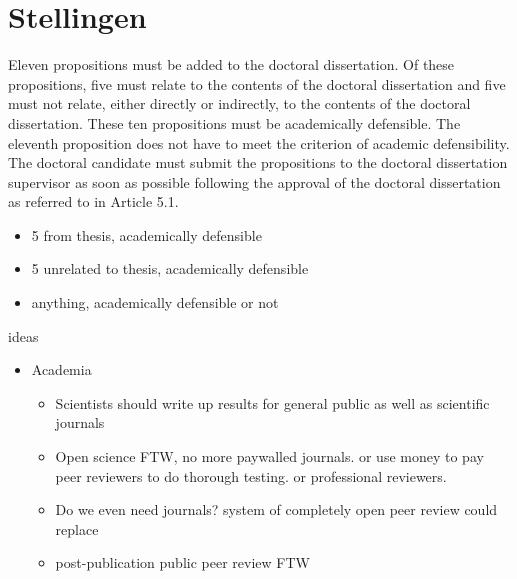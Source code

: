 \chapter*{Stellingen}

Eleven propositions must be added to the doctoral dissertation. Of these propositions,
five must relate to the contents of the doctoral dissertation and five must not relate,
either directly or indirectly, to the contents of the doctoral dissertation. These ten
propositions must be academically defensible. The eleventh proposition does not have
to meet the criterion of academic defensibility. The doctoral candidate must submit the
propositions to the doctoral dissertation supervisor as soon as possible following the
approval of the doctoral dissertation as referred to in Article 5.1.

\begin{itemize}
\item 5 from thesis, academically defensible
\item 5 unrelated to thesis, academically defensible
\item anything, academically defensible or not
\end{itemize}


ideas

\begin{itemize}
\item Academia
    \begin{itemize}
     \item Scientists should write up results for general public as well as scientific journals
     \item Open science FTW, no more paywalled journals. or use money to pay peer reviewers to do thorough testing. or professional reviewers.
     \item Do we even need journals? system of completely open peer review could replace
     \item post-publication public peer review FTW
    \end{itemize}
\end{itemize}
